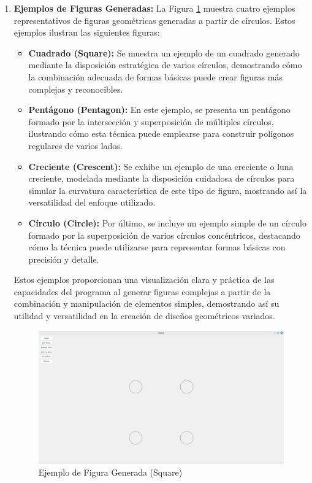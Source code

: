 \documentclass[conference]{IEEEtran}
\begin{document}
\begin{enumerate}
\item \textbf{Ejemplos de Figuras Generadas:}
La Figura \ref{fig:ejemplos_figuras_generadas} muestra cuatro ejemplos representativos de figuras geométricas generadas a partir de círculos. Estos ejemplos ilustran las siguientes figuras:

\begin{itemize}
    \item \textbf{Cuadrado (Square):} Se muestra un ejemplo de un cuadrado generado mediante la disposición estratégica de varios círculos, demostrando cómo la combinación adecuada de formas básicas puede crear figuras más complejas y reconocibles.
    \item \textbf{Pentágono (Pentagon):} En este ejemplo, se presenta un pentágono formado por la intersección y superposición de múltiples círculos, ilustrando cómo esta técnica puede emplearse para construir polígonos regulares de varios lados.
    \item \textbf{Creciente (Crescent):} Se exhibe un ejemplo de una creciente o luna creciente, modelada mediante la disposición cuidadosa de círculos para simular la curvatura característica de este tipo de figura, mostrando así la versatilidad del enfoque utilizado.
    \item \textbf{Círculo (Circle):} Por último, se incluye un ejemplo simple de un círculo formado por la superposición de varios círculos concéntricos, destacando cómo la técnica puede utilizarse para representar formas básicas con precisión y detalle.
\end{itemize}

Estos ejemplos proporcionan una visualización clara y práctica de las capacidades del programa al generar figuras complejas a partir de la combinación y manipulación de elementos simples, demostrando así su utilidad y versatilidad en la creación de diseños geométricos variados.

\begin{figure}[h]
    \centering
    \includegraphics[width=0.8\linewidth]{images/4.png}
    \caption{Ejemplo de Figura Generada (Square)}
    \label{fig:ejemplos_figuras_generadas}
\end{figure}


\end{enumerate}
\end{document}
